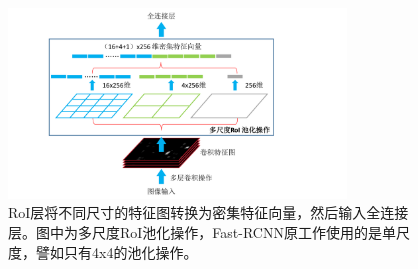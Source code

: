 \begin{figure}[t]
	\centering
	\includegraphics[trim={4cm, 0cm, 7cm, 0cm}, clip,width=0.8\textwidth]{./imgs/roi.pdf}
	\caption{RoI层将不同尺寸的特征图转换为密集特征向量，然后输入全连接层。图中为多尺度RoI池化操作，Fast-RCNN原工作使用的是单尺度，譬如只有4x4的池化操作。}
	\label{fig:roi}
\end{figure}

